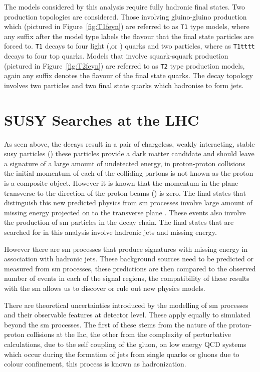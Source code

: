 The models considered by this analysis require fully hadronic final states. Two 
production topologies are considered. Those involving gluino-gluino production which (pictured in Figure~\ref{fig:T1feyn}) are referred to as \texttt{T1} type models, 
where any suffix after the model type labels the flavour that the final state particles are forced to. \texttt{T1} decays to four light (\Pup,\Pdown or \Pcharm) quarks and two \PSneutralino particles, where as \texttt{T1tttt} decays to four top quarks.
Models that involve squark-squark production (pictured in Figure~\ref{fig:T2feyn}) are referred to as \texttt{T2} type production models, again any suffix denotes the flavour of the final state quarks. The decay topology involves two \PSneutralino particles and two final state quarks which hadronise to form jets.


\section{SUSY Searches at the LHC} %
\label{cha:motivating_the_alt_analysis}

As seen above, the decays result in a pair of chargeless, weakly interacting, stable \ac{susy} particles (\HepProcess{\PSneutralino}) these particles  provide a dark matter candidate and should leave a signature of a large amount of undetected energy, in proton-proton collisions the initial momentum of each of the colliding partons is not known as the proton is a composite object. However it is known that the momentum in the plane transverse to the direction of the proton beams (\pt) is zero. The final states that distinguish this new 
predicted physics from \ac{sm} processes involve large amount of missing energy 
projected on to the transverse plane \ETm. These events also involve the 
production of \ac{sm} particles in the decay chain. The final states that are 
searched for in this analysis involve hadronic jets and missing energy.

However there are \ac{sm} processes that produce signatures with missing energy 
in association with hadronic jets. These background sources need to be 
predicted or measured from \ac{sm} processes, these predictions are then 
compared to the observed number of events in each of the signal regions, the 
compatibility of these results with the \ac{sm} allows us to discover or rule 
out new physics models.

There are theoretical uncertainties introduced by the modelling of \ac{sm} 
processes and their observable features at detector level. These apply equally 
to simulated beyond the \ac{sm} processes. The first of these stems from the 
nature of the proton-proton collisions at the \ac{lhc}, the other from the 
complexity of perturbative calculations, due to the self coupling of the gluon, 
on low energy QCD systems which occur during the formation of jets from single 
quarks or gluons due to colour confinement, this process is known as 
hadronization.

